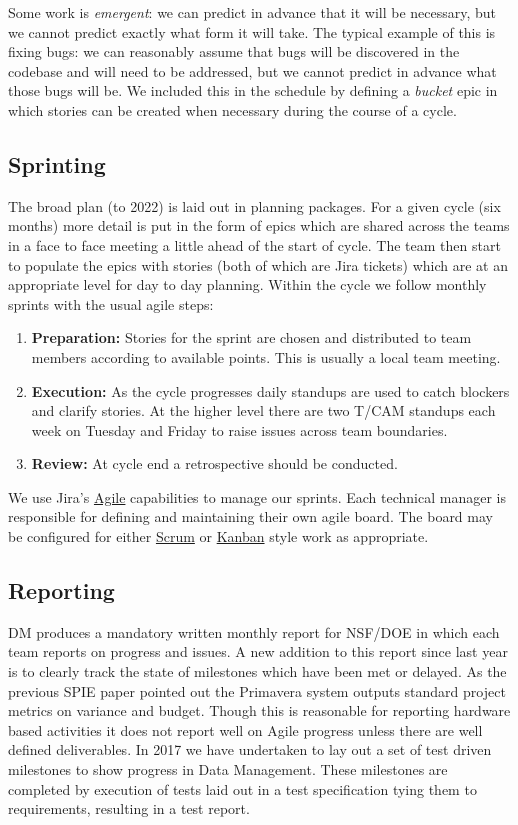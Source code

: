 Some work is \emph{emergent}: we can predict in advance that it will be necessary, but we cannot
predict exactly what form it will take. The typical example of this is fixing bugs: we can reasonably
assume that bugs will be discovered in the codebase and will need to be addressed,
but we cannot predict in advance what those bugs will be.
We included this in the schedule by defining a \emph{bucket} epic in which stories can be created
when necessary during the course of a cycle.

\subsection{Sprinting} \label{sec:sprint} \label{sec:jira_ticket}
The broad plan (to 2022) is laid out in planning packages.
For a  given  cycle (six months)   more detail is put in the form of epics which  are shared across the teams in a face to face meeting a little ahead of the start of cycle.  The team then start to populate the epics with stories (both of which are Jira tickets)  which are at an appropriate level for day to day planning.
Within the cycle we follow monthly sprints with the usual agile steps:
\begin{enumerate}
\item \textbf{Preparation:} Stories for the sprint are chosen and distributed to team members according to available points. This is usually a local team meeting.
\item \textbf{Execution:} As the cycle progresses daily standups are used to catch blockers and clarify stories. At the higher level there are two T/CAM standups each week on Tuesday and Friday to raise issues across team boundaries.
\item \textbf{Review:} At cycle end a retrospective should be conducted.
\end{enumerate}

We use Jira's
\href{https://www.atlassian.com/software/jira/agile}{Agile} capabilities
to manage our sprints. Each technical manager is responsible for
defining and maintaining their own agile board. The board may be
configured for either
\href{https://en.wikipedia.org/wiki/Scrum_(software_development)}{Scrum}
or \href{https://en.wikipedia.org/wiki/Kanban_(development)}{Kanban}
style work as appropriate.

\subsection{Reporting}
DM produces a mandatory written monthly report for NSF/DOE in which each team reports on progress and issues. A new addition to this report since last year is to clearly track the state of milestones which have been met or delayed.
As the previous SPIE paper \cite{2016SPIE.9911E..0NK} pointed out the Primavera system outputs standard project metrics on variance and budget.
Though this is reasonable  for reporting hardware based activities it does not report well on Agile progress unless there are well defined deliverables.
In 2017 we have undertaken to lay out a set of test driven milestones to show progress in Data Management. These milestones are completed by execution of tests laid out in a test specification tying them to requirements, resulting in a test report.
